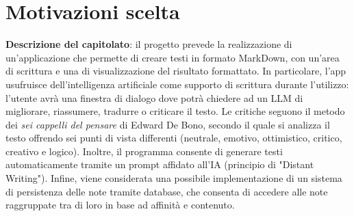 \documentclass[a4paper,10pt]{article}
\begin{document}
\vspace{1\baselineskip}
\section*{Motivazioni scelta}
\textbf{Descrizione del capitolato}: il progetto prevede la realizzazione di un'applicazione che permette di creare testi in formato MarkDown, con un'area di scrittura e una di visualizzazione del risultato formattato. In particolare, l'app usufruisce dell'intelligenza artificiale come supporto di scrittura durante l'utilizzo: l'utente avrà una finestra di dialogo dove potrà chiedere ad un LLM di migliorare, riassumere, tradurre o criticare il testo. Le critiche seguono il metodo dei \textit{sei cappelli del pensare} di Edward De Bono, secondo il quale si analizza il testo offrendo sei punti di vista differenti (neutrale, emotivo, ottimistico, critico, creativo e logico). Inoltre, il programma consente di generare testi automaticamente tramite un prompt affidato all'IA (principio di "Distant Writing"). Infine, viene considerata una possibile implementazione di un sistema di persistenza delle note tramite database, che consenta di accedere alle note raggruppate tra di loro in base ad affinità e contenuto.

\vspace{1\baselineskip}
\end{document}
